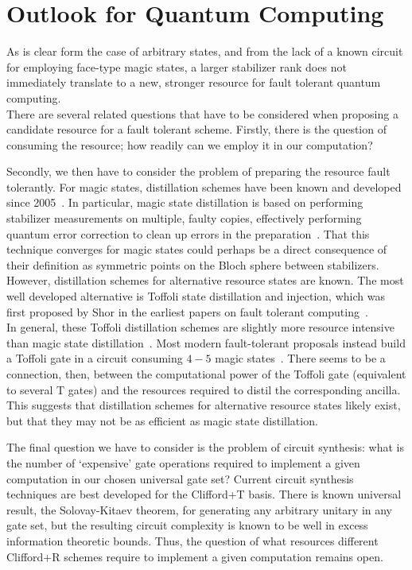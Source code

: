 \documentclass{standalone}
\begin{document}
\section{Outlook for Quantum Computing}
As is clear form the case of arbitrary states, and from the lack of a known circuit for employing face-type magic states, a larger stabilizer rank does not immediately translate to a new, stronger resource for fault tolerant quantum computing. \\
There are several related questions that have to be considered when proposing a candidate resource for a fault tolerant scheme. Firstly, there is the question of consuming the resource; how readily can we employ it in our computation? 
\par
Secondly, we then have to consider the problem of preparing the resource fault tolerantly. For magic states, distillation schemes have been known and developed since 2005~\cite{Bravyi2005}. In particular, magic state distillation is based on performing stabilizer measurements on multiple, faulty copies, effectively performing quantum error correction to clean up errors in the preparation~\cite{Bravyi2005}. That this technique converges for magic states could perhaps be a direct consequence of their definition as symmetric points on the Bloch sphere between stabilizers.\\
However, distillation schemes for alternative resource states are known. The most well developed alternative is Toffoli state distillation and injection, which was first proposed by Shor in the earliest papers on fault tolerant computing~\cite{Shor96}.\\
In general, these Toffoli distillation schemes are slightly more resource intensive than magic state distillation~\cite{Eastin2013}. Most modern fault-tolerant proposals instead build a Toffoli gate in a circuit consuming $4-5$ magic states~\cite{Howard2016}. There seems to be a connection, then, between the computational power of the Toffoli gate (equivalent to several T gates) and the resources required to distil the corresponding ancilla. This suggests that distillation schemes for alternative resource states likely exist, but that they may not be as efficient as magic state distillation. 
\par
The final question we have to consider is the problem of circuit synthesis: what is the number of `expensive' gate operations required to implement a given computation in our chosen universal gate set? Current circuit synthesis techniques are best developed for the Clifford+T basis. There is known universal result, the Solovay-Kitaev theorem, for generating any arbitrary unitary in any gate set, but the resulting circuit complexity is known to be well in excess information theoretic bounds. Thus, the question of what resources different Clifford+R schemes require to implement a given computation remains open.\\
\end{document}
